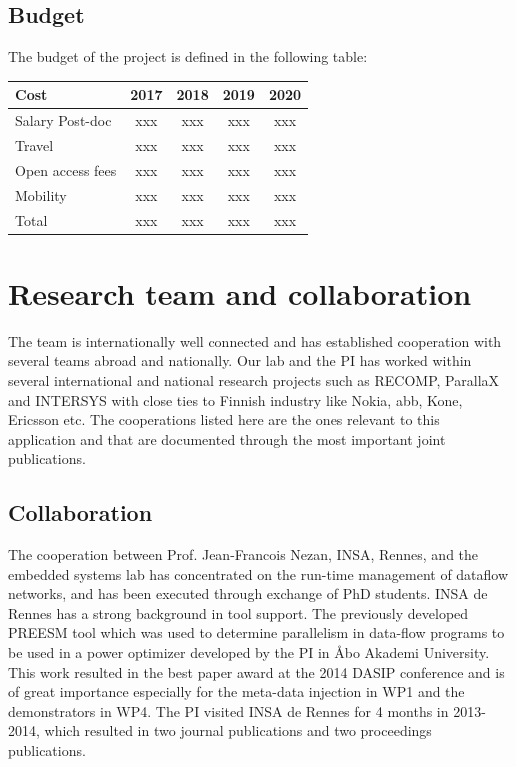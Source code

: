 \documentclass{article}
\begin{document}
\subsection{Budget}
The budget of the project is defined in the following table:
\begin{table}[h]
\begin{center}
\begin{tabular}{ | l | c | c |c |c |}
\hline
{Cost} & {2017} & {2018} & {2019} & {2020} \\ \hline
{Salary Post-doc} & xxx & xxx & xxx & xxx \\ \hline
{Travel} & xxx & xxx & xxx & xxx  \\ \hline
{Open access fees} & xxx & xxx & xxx & xxx  \\ \hline
{Mobility} & xxx & xxx & xxx & xxx  \\ \hline
{Total} & xxx & xxx & xxx & xxx  \\ \hline
\end{tabular}
\label{tab:strconf}
\end{center}

\end{table}

\section{Research team and collaboration}
The team is internationally well connected and has established cooperation with several teams abroad and nationally. 
Our lab and the PI has worked within several international and national research projects such as RECOMP, ParallaX and INTERSYS with close ties to Finnish industry like Nokia, abb, Kone, Ericsson etc.
The cooperations listed here are the ones relevant to this application and that are documented through the most important joint publications.
\subsection{Collaboration}
The cooperation between Prof. Jean-Francois Nezan, INSA, Rennes, and the embedded systems lab has concentrated on the run-time management of dataflow networks, 
and has been executed through exchange of PhD students.
INSA de Rennes has a strong background in tool support. 
The previously developed PREESM tool which was used to determine parallelism in data-flow programs to be used in a power optimizer developed by the PI in \AA{}bo Akademi University.
This work resulted in the best paper award at the 2014 DASIP conference and is of great importance especially for the meta-data injection in WP1 and the demonstrators in WP4.
The PI visited INSA de Rennes for 4 months in 2013-2014, which resulted in two journal publications and two proceedings publications.
\end{document}
